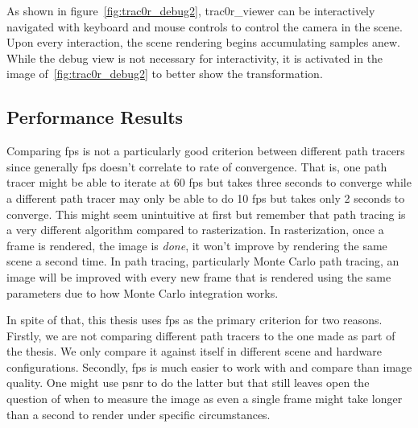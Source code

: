 \documentclass[
  twoside,
  11pt, a4paper,
  footinclude=true,
  headinclude=true,
  cleardoublepage=empty
]{scrreprt}
\begin{document}
As shown in figure~\ref{fig:trac0r_debug2}, trac0r\_viewer can be interactively navigated with
keyboard and mouse controls to control the camera in the scene. Upon every interaction, the scene
rendering begins accumulating samples anew. While the debug view is not necessary for
interactivity, it is activated in the image of~\ref{fig:trac0r_debug2} to better show the
transformation.

\subsection{Performance Results}
Comparing \ac{fps} is not a particularly good criterion between different path tracers since
generally \ac{fps} doesn't correlate to rate of convergence. That is, one path tracer might be able
to iterate at 60 \ac{fps} but takes three seconds to converge while a different path tracer may
only be able to do 10 \ac{fps} but takes only 2 seconds to converge. This might seem unintuitive at
first but remember that path tracing is a very different algorithm compared to rasterization. In
rasterization, once a frame is rendered, the image is \emph{done}, it won't improve by rendering the
same scene a second time. In path tracing, particularly Monte Carlo path tracing, an image will be
improved with every new frame that is rendered using the same parameters due to how Monte Carlo
integration works.

In spite of that, this thesis uses \ac{fps} as the primary criterion for two reasons. Firstly, we are not
comparing different path tracers to the one made as part of the thesis. We only compare it
against itself in different scene and hardware configurations. Secondly, \ac{fps} is much easier
to work with and compare than image quality. One might use \ac{psnr} to do the latter but that
still leaves open the question of when to measure the image as even a single frame might take
longer than a second to render under specific circumstances.
\end{document}
